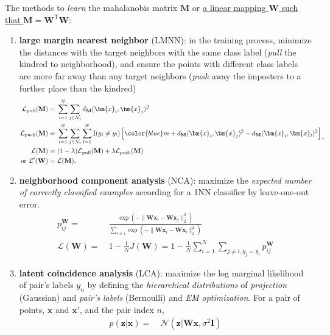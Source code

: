 The methods to \textit{learn} the mahalanobis matrix $\mathbf{M}$ or 
\uline{a linear mapping $\mathbf{W}$ such that $\mathbf{M}=\mathbf{W}^\mathsf{T}\mathbf{W}$}:
\begin{enumerate}[{(1)}]
    \item \textbf{large margin nearest neighbor} (LMNN): in the training process, minimize the distances with the target neighbors with the same class label 
    (\textit{pull} the kindred to neighborhood), 
    and ensure the points with different class labels are more far away than any target neighbors 
    (\textit{push} away the imposters to a further place than the kindred)
    \begin{align}
        \mathcal{L}_\text{pull}(\mathbf{M})
        =&~ \sum_{i=1}^N\sum_{j\in\mathcal{N}_i}d_\mathbf{M}(\bm{x}_i,\bm{x}_j)^2 \\
        \mathcal{L}_\text{push}(\mathbf{M})
        =&~ \sum_{i=1}^N\sum_{j\in\mathcal{N}_i}\sum_{l=1}^N\mathbb{I}(y_i\neq y_l)\left[{\color{blue}m}+d_\mathbf{M}(\bm{x}_i,\bm{x}_j)^2-d_\mathbf{M}(\bm{x}_i,\bm{x}_l)^2\right]_+ \label{eq:lmnnpush} \\
        \mathcal{L}(\mathbf{M}) =&~ (1-\lambda)\mathcal{L}_\text{pull}(\mathbf{M}) + \lambda\mathcal{L}_\text{push}(\mathbf{M}) \\
        \text{or}~\mathcal{L}'(\mathbf{W}) =&~ \mathcal{L}(\mathbf{M}),
    \end{align}
    \item \textbf{neighborhood component analysis} (NCA): 
    maximize the \textit{expected number of correctly classified examples} according for a 1NN classifier by  leave-one-out error.
    \begin{align}
        p_{ij}^\mathbf{W} =&~ \frac{\exp(-\|\mathbf{W}\bm{x}_i-\mathbf{W}\bm{x}_j\|_2^2)}{\sum_{l\neq i}\exp(-\|\mathbf{W}\bm{x}_i-\mathbf{W}\bm{x}_l\|_2^2)} \\
        \mathcal{L}(\mathbf{W}) =&~ 1 - \frac{1}{N}J(\mathbf{W}) = 1 - \frac{1}{N}\sum_{i=1}^N\sum_{j\neq i,y_j=y_i}p_{ij}^\mathbf{W}
    \end{align}
    \item \textbf{latent coincidence analysis} (LCA): maximize the log marginal likelihood of pair's labels $y_n$ 
    by defining the \textit{hierarchical distributions} of \textit{projection} (Gaussian) and \textit{pair's labels} (Bernoulli) and \textit{EM optimization}.
    For a pair of points, $\bm{x}$ and $\bm{x}'$, and the pair index $n$,
    \begin{align}
        p(\bm{z}|\bm{x}) =&~ \mathcal{N}(\bm{z}|\mathbf{W}\bm{x},\sigma^2\mathbf{I}) \\

\end{align}
\end{enumerate}
